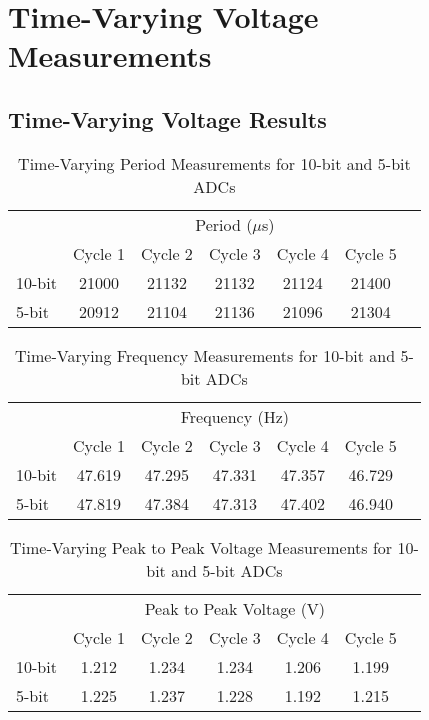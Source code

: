 \section{Time-Varying Voltage Measurements}
\subsection{Time-Varying Voltage Results}
\begin{table}[h]
    \centering
    \caption{Time-Varying Period Measurements for 10-bit and 5-bit ADCs}
    \begin{tabular}{lcccccc}
    \toprule
       & \multicolumn{5}{c}{Period ($\mu$s)}    \\
    \cmidrule{2-6}
       & Cycle 1    & Cycle 2   & Cycle 3   & Cycle 4   & Cycle 5    \\
    \midrule
    10-bit & 21000 & 21132 & 21132 & 21124 & 21400  \\
    5-bit  & 20912 & 21104 & 21136 & 21096 & 21304  \\
    \bottomrule
    \end{tabular}
\end{table}

\begin{table}[h]
    \centering
    \caption{Time-Varying Frequency Measurements for 10-bit and 5-bit ADCs}
    \begin{tabular}{lcccccc}
    \toprule
       & \multicolumn{5}{c}{Frequency (Hz)}    \\
    \cmidrule{2-6}
       & Cycle 1    & Cycle 2   & Cycle 3   & Cycle 4   & Cycle 5    \\
    \midrule
    10-bit & 47.619 & 47.295 & 47.331 & 47.357 & 46.729  \\
    5-bit  & 47.819 & 47.384 & 47.313 & 47.402 & 46.940  \\
    \bottomrule
    \end{tabular}
\end{table}

\begin{table}[h]
    \centering
    \caption{Time-Varying Peak to Peak Voltage Measurements for 10-bit and 5-bit ADCs}
    \begin{tabular}{lcccccc}
    \toprule
       & \multicolumn{5}{c}{Peak to Peak Voltage (V)}    \\
    \cmidrule{2-6}
       & Cycle 1    & Cycle 2   & Cycle 3   & Cycle 4   & Cycle 5    \\
    \midrule
    10-bit & 1.212 & 1.234 & 1.234 & 1.206 & 1.199  \\
    5-bit  & 1.225 & 1.237 & 1.228 & 1.192 & 1.215  \\
    \bottomrule
    \end{tabular}
\end{table}

